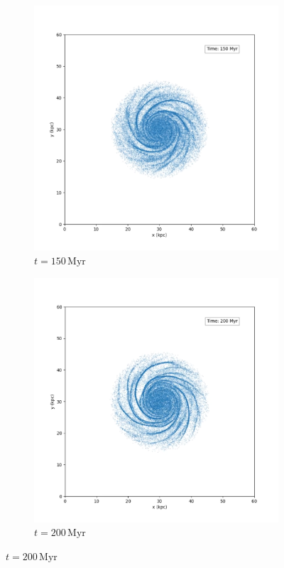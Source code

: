 \begin{figure}[!ht]
    \vspace{0.2cm}

    \begin{subfigure}[b]{0.45\textwidth}
        \centering
        \includegraphics[width=\textwidth]{chapters/results/img/pm-galaxy/150myr.png}
        \caption{$t=150\,\text{Myr}$}
        \label{fig:spiral-galaxy-evolution-pm-sub3}
    \end{subfigure}
    \hfill
    \begin{subfigure}[b]{0.45\textwidth}
        \centering
        \includegraphics[width=\textwidth]{chapters/results/img/pm-galaxy/200myr.png}
        \caption{$t=200\,\text{Myr}$}
        \label{fig:spiral-galaxy-evolution-pm-sub4}
    \end{subfigure}


\end{figure}
